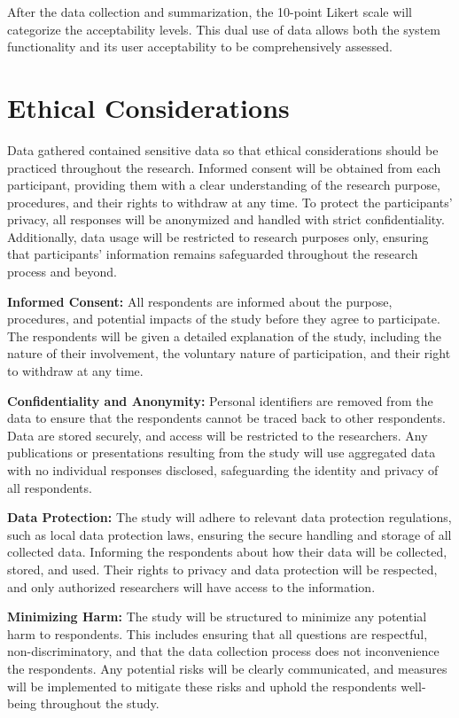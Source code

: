 	After the data collection and summarization, the 10-point Likert scale will categorize the acceptability levels. This dual use of data allows both the system functionality and its user acceptability to be comprehensively assessed. 

\section{Ethical Considerations}
	Data gathered contained sensitive data so that ethical considerations should be practiced throughout the research.  Informed consent will be obtained from each participant, providing them with a clear understanding of the research purpose, procedures, and their rights to withdraw at any time. To protect the participants’ privacy, all responses will be anonymized and handled with strict confidentiality. Additionally, data usage will be restricted to research purposes only, ensuring that participants' information remains safeguarded throughout the research process and beyond. 
	
	\textbf{Informed Consent:} All respondents are informed about the purpose, procedures, and potential impacts of the study before they agree to participate. The respondents will be given a detailed explanation of the study, including the nature of their involvement, the voluntary nature of participation, and their right to withdraw at any time.
	
	\textbf{Confidentiality and Anonymity:} Personal identifiers are removed from the data to ensure that the respondents cannot be traced back to other respondents. Data are stored securely, and access will be restricted to the researchers. Any publications or presentations resulting from the study will use aggregated data with no individual responses disclosed, safeguarding the identity and privacy of all respondents.
	
	\textbf{Data Protection:} The study will adhere to relevant data protection regulations, such as local data protection laws, ensuring the secure handling and storage of all collected data. Informing the respondents about how their data will be collected, stored, and used. Their rights to privacy and data protection will be respected, and only authorized researchers will have access to the information.
	
	\textbf{Minimizing Harm:} The study will be structured to minimize any potential harm to respondents. This includes ensuring that all questions are respectful, non-discriminatory, and that the data collection process does not inconvenience the respondents. Any potential risks will be clearly communicated, and measures will be implemented to mitigate these risks and uphold the respondents well-being throughout the study.
	
